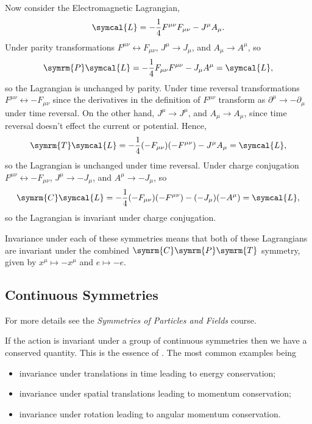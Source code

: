 \documentclass[fleqn]{NotesClass}
\newcommand*{\course}[1]{\textit{#1}}
\newcommand{\lagrangianDensity}{\symcal{L}}
\newcommand{\parity}{\symrm{P}}
\newcommand{\chargeConjugation}{\symrm{C}}
\newcommand{\timeReversal}{\symrm{T}}
\begin{document}
    Now consider the Electromagnetic Lagrangian,
    \begin{equation}
        \lagrangianDensity = -\frac{1}{4}F^{\mu\nu}F_{\mu\nu} - J^\mu A_\mu.
    \end{equation}
    Under parity transformations \(F^{\mu\nu} \leftrightarrow F_{\mu\nu}\), \(J^\mu \to J_\mu\), and \(A_\mu \to A^\mu\), so
    \begin{equation}
        \parity\lagrangianDensity = -\frac{1}{4}F_{\mu\nu}F^{\mu\nu} - J_\mu A^\mu = \lagrangianDensity,
    \end{equation}
    so the Lagrangian is unchanged by parity.
    Under time reversal transformations \(F^{\mu\nu} \leftrightarrow -F_{\mu\nu}\) since the derivatives in the definition of \(F^{\mu\nu}\) transform as \(\partial^\mu \to -\partial_\mu\) under time reversal.
    On the other hand, \(J^\mu \to J^\mu\), and \(A_\mu \to A_\mu\), since time reversal doesn't effect the current or potential.
    Hence,
    \begin{equation}
        \timeReversal\lagrangianDensity = -\frac{1}{4}(-F_{\mu\nu})(-F^{\mu\nu}) - J^\mu A_\mu = \lagrangianDensity,
    \end{equation}
    so the Lagrangian is unchanged under time reversal.
    Under charge conjugation \(F^{\mu\nu} \leftrightarrow -F_{\mu\nu}\), \(J^\mu \to -J_\mu\), and \(A^\mu \to -J_\mu\), so
    \begin{equation}
        \chargeConjugation\lagrangianDensity = -\frac{1}{4}(-F_{\mu\nu})(-F^{\mu\nu}) - (-J_\mu)(-A^\mu) = \lagrangianDensity,
    \end{equation}
    so the Lagrangian is invariant under charge conjugation.
    
    Invariance under each of these symmetries means that both of these Lagrangians are invariant under the combined \(\chargeConjugation\parity\timeReversal\) symmetry, given by \(x^\mu \mapsto -x^\mu\) and \(e \mapsto -e\).
    
    \subsection{Continuous Symmetries}
    \begin{rmk}
        For more details see the \course{Symmetries of Particles and Fields} course.
    \end{rmk}
    If the action is invariant under a group of continuous symmetries then we have a conserved quantity.
    This is the essence of .
    The most common examples being
    \begin{itemize}
        \item invariance under translations in time leading to energy conservation;
        \item invariance under spatial translations leading to momentum conservation;
        \item invariance under rotation leading to angular momentum conservation.
    \end{itemize}
    
\end{document}
